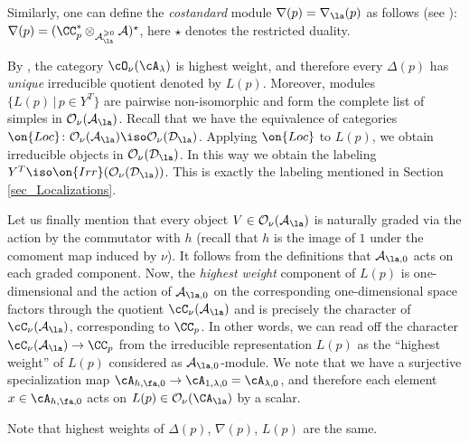 \documentclass[12pt]{amsart}
\newcommand{\CO}{\mathcal{O}}
\begin{document}
\begin{rmk}
Similarly, one can define the {\emph{costandard}} module $\nabla(p)=\nabla_\la(p)$ as follows (see \cite[Section 5.2]{BPWII}): $\nabla(p)= (\CC_p^* \otimes_{\mathcal{A}_\la^{\geqslant 0}} \mathcal{A})^\star$, here $\star$ denotes the restricted duality.
\end{rmk}

By \cite[Proposition 5.17]{BPWII}, the category $\cO_{\nu}(\cA_\lambda)$ is highest weight, and therefore every $\Delta(p)$ has {\emph{unique}} irreducible quotient denoted by $L(p)$. Moreover, modules $\{L(p)\,|\, p \in Y^T\}$ are pairwise non-isomorphic and form the complete list of simples in $\CO_\nu(\mathcal{A}_\la)$. Recall that we have the equivalence of categories $\on{Loc}\colon \CO_\nu(\mathcal{A}_\la) \iso \CO_\nu(\mathcal{D}_\la)$. Applying $\on{Loc}$ to $L(p)$, we obtain irreducible objects in $\CO_\nu(\mathcal{D}_\la)$. In this way we obtain the  labeling $Y^T \iso \on{Irr}(\CO_\nu(\mathcal{D}_\la))$. This is exactly the labeling mentioned in Section \ref{sec_Localizations}. 


Let us finally mention that every object $V \in \mathcal{O}_\nu(\mathcal{A}_\la)$ is naturally graded via the action by the commutator with  $h$ (recall that $h$ is the image of $1$ under the comoment map induced by $\nu$). %
It follows from the definitions that $\mathcal{A}_{\la,0}$ acts on each graded component. Now, the {\emph{highest weight}} component of $L(p)$ is one-dimensional and the action of $\mathcal{A}_{\la,0}$ on the corresponding one-dimensional space factors through the quotient $\cC_\nu(\mathcal{A}_\la)$ and is precisely the character of $\cC_\nu(\mathcal{A}_\la)$, corresponding to $\CC_p$. In other words, we can read off the character $\cC_\nu(\mathcal{A}_\la) \rightarrow \CC_p$ from the irreducible representation $L(p)$ as the ``highest weight'' of $L(p)$ considered as $\mathcal{A}_{\la,0}$-module. We note that we have a surjective specialization map $\cA_{h, \fa, 0}\to \cA_{1, \lambda, 0}=\cA_{\lambda, 0}$, and therefore each element $x\in \cA_{h, \fa, 0}$ acts on $L(p)\in \CO_\nu(\CA_{\la})$ by a scalar.



\begin{rmk}
Note that highest weights of $\Delta(p)$, $\nabla(p)$, $L(p)$ are the same.    
\end{rmk}
\end{document}
